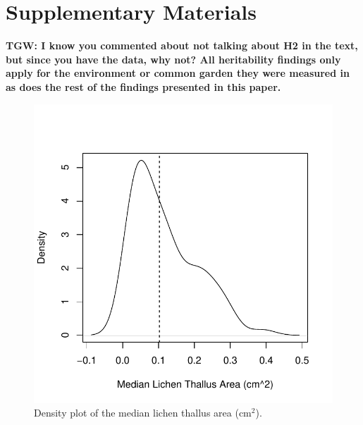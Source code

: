 \documentclass[9pt,twocolumn,twoside,lineno]{pnas-new}
\begin{document}


\showacknow{} %



\newpage

\section*{Supplementary Materials}

\textbf{TGW: I know you commented about not talking about H2 in the
  text, but since you have the data, why not?  All heritability
  findings only apply for the environment or common garden they were
  measured in as does the rest of the findings presented in this
  paper.}

 

\setcounter{figure}{0}
\setcounter{table}{0}

\begin{figure}[ht]
\centering
\includegraphics[width=\linewidth]{supplement/xg_size.pdf}
\caption{Density plot of the median lichen thallus area (cm$^2$). }
\label{fig:SI_xg_median}
\end{figure}

 
 
 
 
 
 
 
\end{document}
